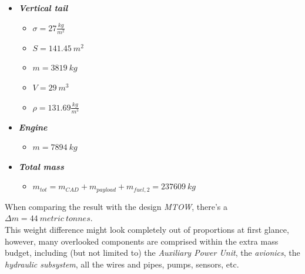 \documentclass{article}
\begin{document}
\begin{itemize}
\begin{itemize}
        \end{itemize}
    \item \textbf{\textit{Vertical tail}}
        \begin{itemize}
            \item $\sigma = 27 \frac{kg}{m^2}$
            \item $S = 141.45 \ m^2$
            \item $m = 3819 \ kg$
            \item $V = 29 \ m^3$
            \item $\rho = 131.69 \frac{kg}{m^3}$
        \end{itemize}
    \item \textbf{\textit{Engine}}
        \begin{itemize}
            \item $m = 7894 \ kg$
        \end{itemize}
    \item \textbf{\textit{Total mass}}
        \begin{itemize}
            \item $m_{tot} = m_{CAD} + m_{payload} + m_{fuel,2} = 237609 \ kg$
        \end{itemize}
        
\end{itemize}

\clearpage

When comparing the result with the design \textit{MTOW}, there's a $\Delta m = 44 \ metric \ tonnes$. \\ 

This weight difference might look completely out of proportions at first glance, however, many overlooked components
are comprised within the extra mass budget, including (but not limited to) the \textit{Auxiliary Power Unit}, 
the \textit{avionics}, the \textit{hydraulic subsystem}, all the wires and pipes, pumps, sensors, etc. \\ 
\end{document}
